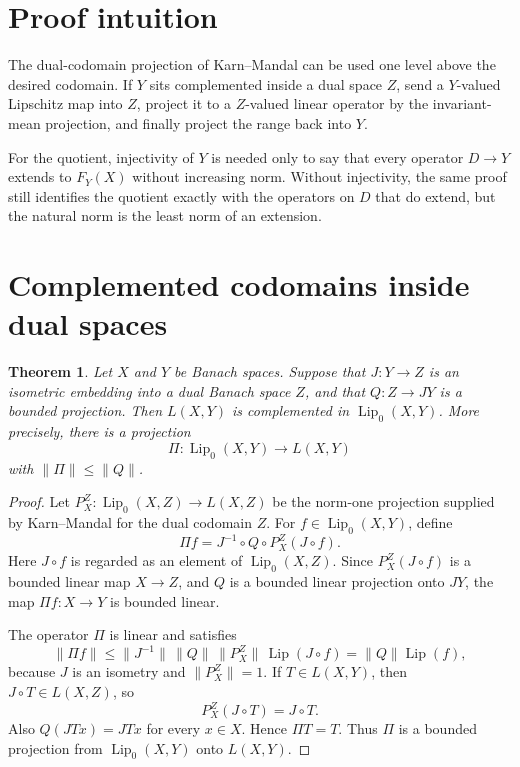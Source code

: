 \documentclass[11pt]{article}
\newtheorem{theorem}{Theorem}
\DeclareMathOperator{\Lip}{Lip}
\begin{document}
\section*{Proof intuition}

The dual-codomain projection of Karn--Mandal can be used one level above
the desired codomain. If \(Y\) sits complemented inside a dual space \(Z\),
send a \(Y\)-valued Lipschitz map into \(Z\), project it to a \(Z\)-valued
linear operator by the invariant-mean projection, and finally project the
range back into \(Y\).

For the quotient, injectivity of \(Y\) is needed only to say that every
operator \(D\to Y\) extends to \(F_Y(X)\) without increasing norm. Without
injectivity, the same proof still identifies the quotient exactly with the
operators on \(D\) that do extend, but the natural norm is the least norm of
an extension.

\section*{Complemented codomains inside dual spaces}

\begin{theorem}
Let \(X\) and \(Y\) be Banach spaces. Suppose that \(J:Y\to Z\) is an
isometric embedding into a dual Banach space \(Z\), and that \(Q:Z\to JY\)
is a bounded projection. Then \(L(X,Y)\) is complemented in \(\Lip_0(X,Y)\).
More precisely, there is a projection
\[
  \Pi:\Lip_0(X,Y)\longrightarrow L(X,Y)
\]
with \(\|\Pi\|\leq \|Q\|\).
\end{theorem}

\begin{proof}
Let \(P_X^Z:\Lip_0(X,Z)\to L(X,Z)\) be the norm-one projection supplied by
Karn--Mandal for the dual codomain \(Z\). For \(f\in\Lip_0(X,Y)\), define
\[
  \Pi f
  =
  J^{-1}\circ Q\circ P_X^Z(J\circ f).
\]
Here \(J\circ f\) is regarded as an element of \(\Lip_0(X,Z)\). Since
\(P_X^Z(J\circ f)\) is a bounded linear map \(X\to Z\), and \(Q\) is a
bounded linear projection onto \(JY\), the map \(\Pi f:X\to Y\) is bounded
linear.

The operator \(\Pi\) is linear and satisfies
\[
  \|\Pi f\|
  \leq \|J^{-1}\|\,\|Q\|\,\|P_X^Z\|\,\Lip(J\circ f)
  = \|Q\|\Lip(f),
\]
because \(J\) is an isometry and \(\|P_X^Z\|=1\).
If \(T\in L(X,Y)\), then \(J\circ T\in L(X,Z)\), so
\[
  P_X^Z(J\circ T)=J\circ T.
\]
Also \(Q(JTx)=JTx\) for every \(x\in X\). Hence \(\Pi T=T\). Thus \(\Pi\)
is a bounded projection from \(\Lip_0(X,Y)\) onto \(L(X,Y)\).
\end{proof}
\end{document}

